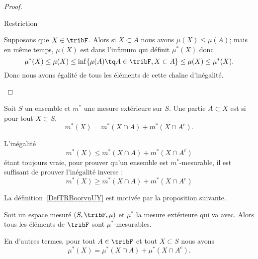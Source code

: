 \begin{proof}
\begin{subproof}
    \item[Restriction]

    Supposons que \( X\in\tribF\). Alors si \( X\subset A\) nous avons \( \mu(X)\leq \mu(A)\); mais en même temps, \( \mu(X)\) est dans l'infimum qui définit \( \mu^*(X)\) donc
    \begin{equation}
        \mu^*(X)\leq\mu(X)\leq \inf \{ \mu(A)\tq A\in\tribF,X\subset A \}\leq \mu(X)\leq\mu^*(X).
    \end{equation}
    Donc nous avons égalité de tous les éléments de cette chaîne d'inégalité.
    \end{subproof}
\end{proof}

\begin{definition}  \label{DefTRBoorvnUY}
    Soit \( S\) un ensemble et \( m^*\) une mesure extérieure sur \( S\). Une partie \( A\subset X\) est  si pour tout \( X\subset S\),
    \begin{equation}
        m^*(X)=m^*(X\cap A)+m^*(X\cap A^c).
    \end{equation}
\end{definition}

\begin{remark}
    L'inégalité
    \begin{equation}
        m^*(X)\leq m^*(X\cap A)+m^*(X\cap A^c)
    \end{equation}
    étant toujours vraie, pour prouver qu'un ensemble est \( m^*\)-mesurable, il est suffisant de prouver l'inégalité inverse :
    \begin{equation}
        m^*(X)\geq m^*(X\cap A)+m^*(X\cap A^c)
    \end{equation}
\end{remark}
La définition~\ref{DefTRBoorvnUY} est motivée par la proposition suivante.

\begin{proposition} \label{PropOJFoozSKAE}
    Soit un espace mesuré \( (S,\tribF,\mu)\) et \( \mu^*\) la mesure extérieure qui va avec. Alors tous les éléments de \( \tribF\) sont \( \mu^*\)-mesurables.

    En d'autres termes, pour tout \( A\in\tribF\) et tout \( X\subset S\) nous avons
    \begin{equation}
        \mu^*(X)=\mu^*(X\cap A)+\mu^*(X\cap A^c).
    \end{equation}
\end{proposition}

